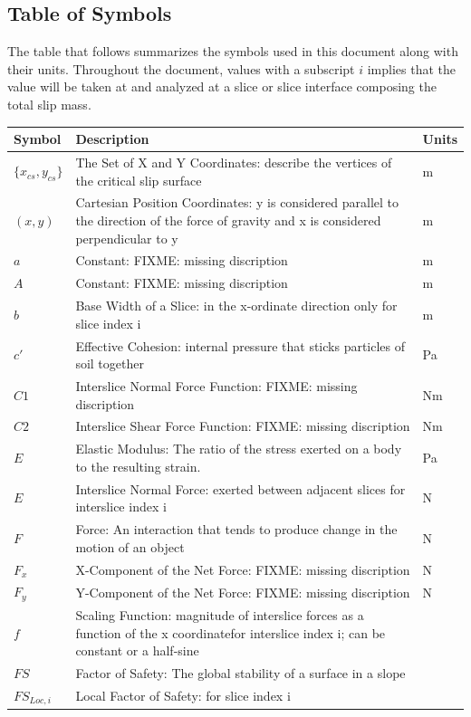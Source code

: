 \documentclass[12pt]{article}
\begin{document}
\subsection{Table of Symbols}
\label{Sec:TablofSymb}
The table that follows summarizes the symbols used in this document along with their units. Throughout the document, values with a subscript $i$ implies that the value will be taken at and analyzed at a slice or slice interface composing the total slip mass.
\begin{longtabu}{l X[l] l}
\toprule
Symbol & Description & Units
\\
\midrule
$\{{x_{cs}}{,y_{cs}}\}$ & The Set of X and Y Coordinates: describe the vertices of the critical slip surface & m
\\
$(x,y)$ & Cartesian Position Coordinates: y is considered parallel to the direction of the force of gravity and x is considered perpendicular to y & m
\\
$a$ & Constant: FIXME: missing discription & m
\\
$A$ & Constant: FIXME: missing discription & m
\\
$b$ & Base Width of a Slice: in the x-ordinate direction only for slice index i & m
\\
$c'$ & Effective Cohesion: internal pressure that sticks particles of soil together & Pa
\\
$C1$ & Interslice Normal Force Function: FIXME: missing discription & Nm
\\
$C2$ & Interslice Shear Force Function: FIXME: missing discription & Nm
\\
$E$ & Elastic Modulus: The ratio of the stress exerted on a body to the resulting strain. & Pa
\\
$E$ & Interslice Normal Force: exerted between adjacent slices for interslice index i & N
\\
$F$ & Force: An interaction that tends to produce change in the motion of an object & N
\\
${F_{x}}$ & X-Component of the Net Force: FIXME: missing discription & N
\\
${F_{y}}$ & Y-Component of the Net Force: FIXME: missing discription & N
\\
$f$ & Scaling Function: magnitude of interslice forces as a function of the x coordinatefor interslice index i; can be constant or a half-sine & 
\\
$FS$ & Factor of Safety: The global stability of a surface in a slope & 
\\
${FS_{Loc,i}}$ & Local Factor of Safety: for slice index i & 

\end{longtabu}
\end{document}
